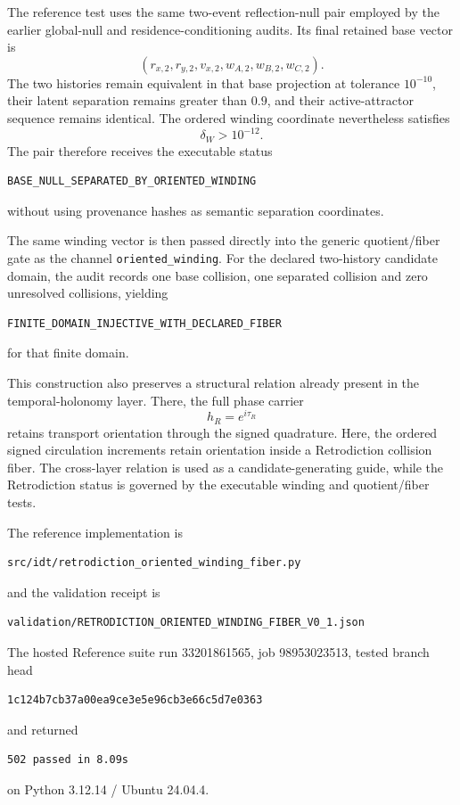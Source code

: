 The reference test uses the same two-event reflection-null pair employed by the earlier global-null and residence-conditioning audits.  Its final retained base vector is
\[
(r_{x,2},r_{y,2},v_{x,2},w_{A,2},w_{B,2},w_{C,2}).
\]
The two histories remain equivalent in that base projection at tolerance $10^{-10}$, their latent separation remains greater than $0.9$, and their active-attractor sequence remains identical.  The ordered winding coordinate nevertheless satisfies
\[
\boxed{
\delta_W>10^{-12}.
}
\]
The pair therefore receives the executable status
\begin{verbatim}
BASE_NULL_SEPARATED_BY_ORIENTED_WINDING
\end{verbatim}
without using provenance hashes as semantic separation coordinates.

The same winding vector is then passed directly into the generic quotient/fiber gate as the channel \texttt{oriented\_winding}.  For the declared two-history candidate domain, the audit records one base collision, one separated collision and zero unresolved collisions, yielding
\begin{verbatim}
FINITE_DOMAIN_INJECTIVE_WITH_DECLARED_FIBER
\end{verbatim}
for that finite domain.

This construction also preserves a structural relation already present in the temporal-holonomy layer.  There, the full phase carrier
\[
h_R=e^{i\tau_R}
\]
retains transport orientation through the signed quadrature.  Here, the ordered signed circulation increments retain orientation inside a Retrodiction collision fiber.  The cross-layer relation is used as a candidate-generating guide, while the Retrodiction status is governed by the executable winding and quotient/fiber tests.

The reference implementation is
\begin{verbatim}
src/idt/retrodiction_oriented_winding_fiber.py
\end{verbatim}
and the validation receipt is
\begin{verbatim}
validation/RETRODICTION_ORIENTED_WINDING_FIBER_V0_1.json
\end{verbatim}
The hosted Reference suite run 33201861565, job 98953023513, tested branch head
\begin{verbatim}
1c124b7cb37a00ea9ce3e5e96cb3e66c5d7e0363
\end{verbatim}
and returned
\begin{verbatim}
502 passed in 8.09s
\end{verbatim}
on Python 3.12.14 / Ubuntu 24.04.4.

